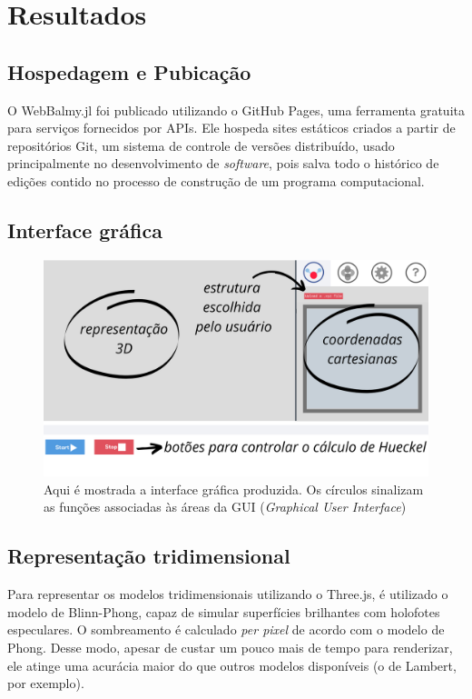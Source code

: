 \chapter{Resultados}
\section{Hospedagem e Pubicação}

O WebBalmy.jl foi publicado utilizando o GitHub Pages, uma ferramenta gratuita para serviços fornecidos por APIs. Ele hospeda sites estáticos criados a partir de repositórios Git, um sistema de controle de versões distribuído, usado principalmente no desenvolvimento de \textit{software}, pois salva todo o histórico de edições contido no processo de construção de um programa computacional. 

\section{Interface gráfica}

\begin{figure}[htb]
	\caption{\label{gui-pronta} Aqui é mostrada a interface gráfica produzida. Os círculos sinalizam as funções associadas às áreas da GUI (\textit{Graphical User Interface})}
	\begin{center}
		\includegraphics[width=1.0\textwidth]{images/GUI-EXAMPLE.png}
	\end{center}
\end{figure}

\section{Representação tridimensional}
Para representar os modelos tridimensionais utilizando o Three.js, é utilizado o modelo de Blinn-Phong, capaz de simular superfícies brilhantes com holofotes especulares. O sombreamento é calculado \textit{per pixel} de acordo com o modelo de Phong. Desse modo, apesar de custar um pouco mais de tempo para renderizar, ele atinge uma acurácia maior do que outros modelos disponíveis (o de Lambert, por exemplo).

